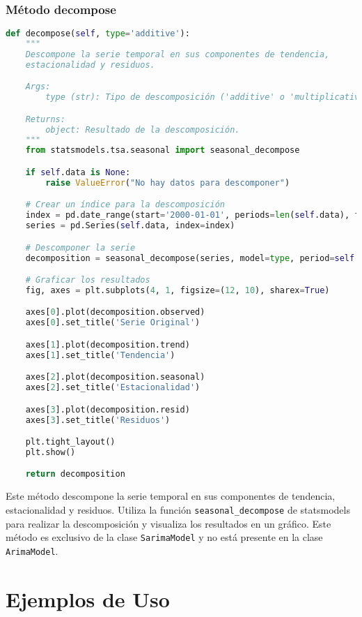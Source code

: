 \documentclass[12pt,letterpaper]{report}
\begin{document}
\subsection{Método decompose}
\begin{lstlisting}[language=python]
def decompose(self, type='additive'):
    """
    Descompone la serie temporal en sus componentes de tendencia,
    estacionalidad y residuos.

    Args:
        type (str): Tipo de descomposición ('additive' o 'multiplicative').

    Returns:
        object: Resultado de la descomposición.
    """
    from statsmodels.tsa.seasonal import seasonal_decompose

    if self.data is None:
        raise ValueError("No hay datos para descomponer")

    # Crear un índice para la descomposición
    index = pd.date_range(start='2000-01-01', periods=len(self.data), freq='D')
    series = pd.Series(self.data, index=index)

    # Descomponer la serie
    decomposition = seasonal_decompose(series, model=type, period=self.seasonal_order[3])

    # Graficar los resultados
    fig, axes = plt.subplots(4, 1, figsize=(12, 10), sharex=True)

    axes[0].plot(decomposition.observed)
    axes[0].set_title('Serie Original')

    axes[1].plot(decomposition.trend)
    axes[1].set_title('Tendencia')

    axes[2].plot(decomposition.seasonal)
    axes[2].set_title('Estacionalidad')

    axes[3].plot(decomposition.resid)
    axes[3].set_title('Residuos')

    plt.tight_layout()
    plt.show()

    return decomposition
\end{lstlisting}

Este método descompone la serie temporal en sus componentes de tendencia, estacionalidad y residuos. Utiliza la función \texttt{seasonal\_decompose} de statsmodels para realizar la descomposición y visualiza los resultados en un gráfico. Este método es exclusivo de la clase \texttt{SarimaModel} y no está presente en la clase \texttt{ArimaModel}.

\chapter{Ejemplos de Uso}
\end{document}
